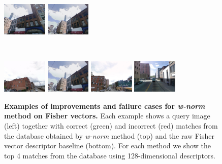 \begin{figure}[t!]
\begin{minipage}{0.75\linewidth}
\begin{minipage}{\linewidth}
                \colorbox{myGreen}{\includegraphics[height=16mm]{imgs/ex4/FVsvm5.jpg}}
                \colorbox{myGreen}{\includegraphics[height=16mm]{imgs/ex4/FVsvm4.jpg}}
            \end{minipage}
            \\
            \begin{minipage}{\linewidth}
                \colorbox{myRed}{\includegraphics[height=16mm]{imgs/ex4/FV1.jpg}}
                \colorbox{myGreen}{\includegraphics[height=16mm]{imgs/ex4/FV2.jpg}}
                \colorbox{myRed}{\includegraphics[height=16mm]{imgs/ex4/FV3.jpg}}
                \colorbox{myRed}{\includegraphics[height=16mm]{imgs/ex4/FV4.jpg}}
            \end{minipage} 
        \end{minipage}
        \caption{
            \textbf{Examples of improvements and failure cases for \emph{w-norm} method on Fisher vectors.}
            Each example shows a query image (left) together with correct (green) and incorrect (red) matches from the database obtained by \emph{w-norm} method (top) and the raw Fisher vector descriptor baseline (bottom). For each method we show the top 4 matches from the database using 128-dimensional descriptors.        
        }
        \label{fig:images}
    \end{figure}